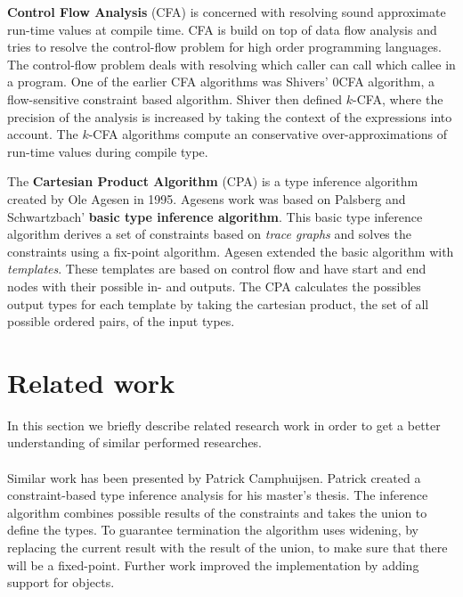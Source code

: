 \documentclass[../main.tex]{subfiles}
\begin{document}
    \textbf{Control Flow Analysis}\cite{Nie:99} (CFA) is concerned with resolving sound approximate run-time values at compile time.
    CFA is build on top of data flow analysis\cite{Aho:86} and tries to resolve the control-flow problem for high order programming languages.
    The control-flow problem deals with resolving which caller can call which callee in a program.
    One of the earlier CFA algorithms was Shivers' $0$CFA algorithm\cite{Shi:88}, a flow-sensitive constraint based algorithm.
    Shiver then defined $k$-CFA\cite{Shi:91}, where the precision of the analysis is increased by taking the context of the expressions into account.
    The $k$-CFA algorithms compute an conservative over-approximations of run-time values during compile type.
	
    The \textbf{Cartesian Product Algorithm}\cite{Age:95} (CPA) is a type inference algorithm created by Ole Agesen in 1995.
    Agesens work was based on Palsberg and Schwartzbach' \textbf{basic type inference algorithm}\cite{Pal:91}.
    This basic type inference algorithm derives a set of constraints based on \textit{trace graphs} and solves the constraints using a fix-point algorithm.
    Agesen extended the basic algorithm with \textit{templates}.
    These templates are based on control flow and have start and end nodes with their possible in- and outputs.
    The CPA calculates the possibles output types for each template by taking the cartesian product, the set of all possible ordered pairs, of the input types.

    \section{Related work}\label{sec:background_related-work}
    In this section we briefly describe related research work in order to get a better understanding of similar performed researches.
    
    \paragraph{}
    Similar work has been presented by Patrick Camphuijsen\cite{Cam:07, Cam:09}.
    Patrick created a constraint-based type inference analysis for his master's thesis.
    The inference algorithm combines possible results of the constraints and takes the union to define the types.
    To guarantee termination the algorithm uses widening, by replacing the current result with the result of the union, to make sure that there will be a fixed-point.
    Further work improved the implementation by adding support for objects\cite{Hoe:15}.
    
\end{document}
